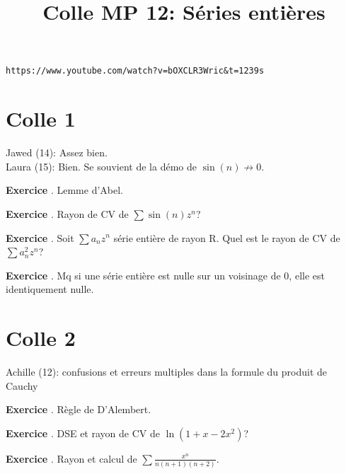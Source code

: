 \documentclass[10pt,a4paper]{article}
\title{Colle MP 12: Séries entières}
\newcounter{question}
\newcounter{exo}
\newenvironment{exo}{\vspace{0.5cm}\setcounter{question}{0}\addtocounter{exo}{1} \noindent \textbf{Exercice \theexo}. \normalsize }{\par}
\begin{document}
\maketitle
\verb|https://www.youtube.com/watch?v=bOXCLR3Wric&t=1239s|
	
	\section*{Colle 1}
	Jawed (14): Assez bien.\\
	Laura (15): Bien. Se souvient de la démo de $\sin(n) \not\longrightarrow 0$.\\
		
	\begin{exo}
		Lemme d'Abel.
	\end{exo}


	\begin{exo}
		Rayon de CV de $\sum \sin(n)z^n$?
	\end{exo}
	\begin{exo}
		Soit $\sum a_n z^n$ série entière de rayon R. Quel est le rayon de CV de $\sum a_n^2 z^n$?
	\end{exo}
			
	\begin{exo}
		Mq si une série entière est nulle sur un voisinage de 0, elle est identiquement nulle.
	\end{exo}
	\section*{Colle 2}
	\setcounter{exo}{0}
	Achille (12): confusions et erreurs multiples dans la formule du produit de Cauchy\\
	
	\begin{exo}
		Règle de D'Alembert.
	\end{exo}
	
	\begin{exo}
		DSE et rayon de CV de $\ln(1 + x - 2x^2)$?
	\end{exo}
	\begin{exo}
		Rayon et calcul de $\sum \frac{x^n}{n(n+1)(n+2)}$.
	\end{exo}
\end{document}
